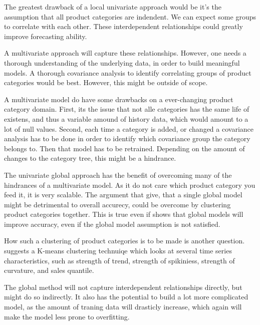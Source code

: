The greatest drawback of a local univariate approach would be it's the assumption that all product categories
are indendent. We can expect some groups to correlate with each other. These interdependent relationships
could greatly improve forecasting ability.

A multivariate approach will capture these relationships.
However, one needs a thorough understanding of the underlying data, in order to build meaningful models.
A thorough covariance analysis to identify correlating groups of product categories would be best.
However, this might be outside of scope.

A multivariate model do have some drawbacks on a ever-changing product category domain.
First, its the issue that not alle categories has the same life of existens, and thus a variable
amound of history data, which would amount to a lot of null values.
Second, each time a category is added, or changed a covariance analysis has to be done in order to identify
which covariance group the category belongs to. Then that model has to be retrained.
Depending on the amount of changes to the category tree, this might be a hindrance.

The univariate global approach has the benefit of overcoming many of the hindrances of a multivariate model.
As it do not care which product category you feed it, it is very scalable. The argument that \cite{Bandara2017}
give, that a single global model might be detrimental to overall accurecy, could be overcome by clustering product categories together. This is true even if \cite{Rabanser2020}
shows that global models will improve accuracy, even if the global model assumption is not satisfied.

How such a clustering of product categories is to be made is another question.
\cite{Bandara2017} suggests a K-means clustering technuiqe
which looks at several time series characteristics, such as 
strength of trend, strength of spikiniess, strength of curvature,
and sales quantile.

The global method will not capture interdependent relationships directly,
but might do so indirectly. It also has the potential to build a lot more complicated model,
as the amount of traning data will drasticly increase, which again will make the model less prone to 
overfitting.

